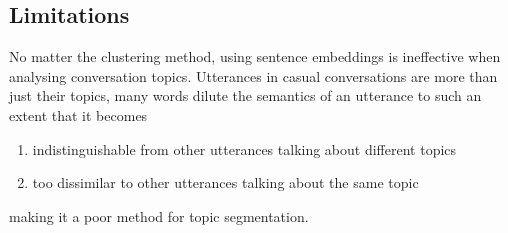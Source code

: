    \subsection{Limitations}
        No matter the clustering method, using sentence embeddings is ineffective when analysing conversation topics. Utterances in casual conversations are more than just their topics, many words dilute the semantics of an \gls{utterance} to such an extent that it becomes 
        \begin{enumerate}
            \item indistinguishable from other \glspl{utterance} talking about different topics
            \item too dissimilar to other utterances talking about the same topic
        \end{enumerate}
        making it a poor method for topic segmentation.
        
        
        
        
        
        
        
        
